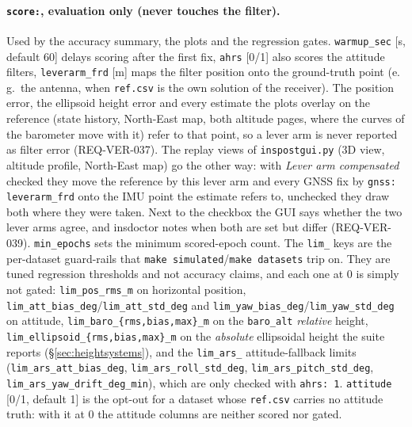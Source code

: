 \documentclass[11pt,a4paper]{article}
\newcommand{\code}[1]{\texttt{#1}}
\begin{document}
\paragraph{\code{score:}, evaluation only (never touches the filter).}
Used by the accuracy summary, the plots and the regression gates. \code{warmup\_\allowbreak{}sec}
[s, default 60] delays scoring after the first fix, \code{ahrs} [0/1] also scores
the attitude filters, \code{leverarm\_\allowbreak{}frd} [m] maps the filter position onto the
ground-truth point (e.\,g.\ the antenna, when \code{ref.csv} is the own solution of
the receiver). The position error, the ellipsoid height error and every estimate
the plots overlay on the reference (state history, North-East map, both altitude
pages, where the curves of the barometer move with it) refer to that point, so a
lever arm is never reported as filter error (REQ-VER-037).
The replay views of \code{inspostgui.py} (3D view, altitude profile, North-East
map) go the other way: with \emph{Lever arm compensated} checked they move the
reference by this lever arm and every GNSS fix by \code{gnss:}
\code{leverarm\_\allowbreak{}frd} onto the IMU point the estimate refers to,
unchecked they draw both where they were taken. Next to the checkbox the GUI
says whether the two lever arms agree, and insdoctor notes when both are set
but differ (REQ-VER-039).
\code{min\_\allowbreak{}epochs} sets the minimum scored-epoch count. The
\code{lim\_\allowbreak*} keys are the per-dataset
guard-rails that \code{make simulated}/\code{make datasets} trip on. They are
tuned regression thresholds and not accuracy claims, and each one at 0 is simply
not gated: \code{lim\_\allowbreak{}pos\_\allowbreak{}rms\_\allowbreak{}m} on horizontal position,
\code{lim\_\allowbreak{}att\_\allowbreak{}bias\_\allowbreak{}deg}/\code{lim\_\allowbreak{}att\_\allowbreak{}std\_\allowbreak{}deg} and
\code{lim\_\allowbreak{}yaw\_\allowbreak{}bias\_\allowbreak{}deg}/\code{lim\_\allowbreak{}yaw\_\allowbreak{}std\_\allowbreak{}deg} on attitude,
\code{lim\_baro\_\{rms,bias,max\}\_m} on the \code{baro\_\allowbreak{}alt} \emph{relative}
height, \code{lim\_ellipsoid\_\{rms,bias,max\}\_m} on the \emph{absolute}
ellipsoidal height the suite reports (\S\ref{sec:heightsystems}), and the
\code{lim\_\allowbreak{}ars\_\allowbreak*} attitude-fallback limits (\code{lim\_\allowbreak{}ars\_\allowbreak{}att\_\allowbreak{}bias\_\allowbreak{}deg},
\code{lim\_\allowbreak{}ars\_\allowbreak{}roll\_\allowbreak{}std\_\allowbreak{}deg}, \code{lim\_\allowbreak{}ars\_\allowbreak{}pitch\_\allowbreak{}std\_\allowbreak{}deg},
\code{lim\_\allowbreak{}ars\_\allowbreak{}yaw\_\allowbreak{}drift\_\allowbreak{}deg\_\allowbreak{}min}), which are only checked with
\code{ahrs: 1}. \code{attitude} [0/1, default 1] is the opt-out for a
dataset whose \code{ref.csv} carries no attitude truth: with it at 0 the
attitude columns are neither scored nor gated.
\end{document}
